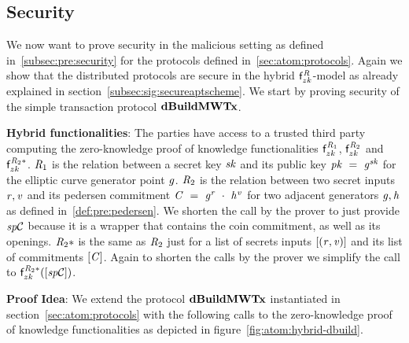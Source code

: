 \subsection{Security}\label{subsec:atom:security}

We now want to prove security in the malicious setting as defined in~\ref{subsec:pre:security} for the protocols defined in~\ref{sec:atom:protocols}.
Again we show that the distributed protocols are secure in the hybrid $\mathsf{f}^{\mathit{R}}_{zk}$-model as already explained in section~\ref{subsec:sig:secureaptscheme}.
We start by proving security of the simple transaction protocol $\mathbf{dBuildMWTx}$.

\textbf{Hybrid functionalities}: The parties have access to a trusted third party computing the zero-knowledge proof of knowledge functionalities $\mathsf{f}^{\mathit{R}_1}_{zk}$, $\mathsf{f}^{\mathit{R}_2}_{zk}$ and $\mathsf{f}^{\mathit{R}_2*}_{zk}$.
$\mathit{R}_1$ is the relation between a secret key $\mathit{sk}$ and its public key $\mathit{pk} ~=~ \mathit{g}^{\mathit{sk}}$ for the elliptic curve generator point $\mathit{g}$.
$\mathit{R}_2$ is the relation between two secret inputs $\mathit{r}, \mathit{v}$ and its pedersen commitment $\mathit{C} ~=~ \mathit{g}^{\mathit{r}} ~\cdot~ \mathit{h}^{\mathit{v}}$ for two adjacent generators $\mathit{g}, \mathit{h}$ as defined in~\ref{def:pre:pedersen}.
We shorten the call by the prover to just provide $\mathit{sp}\mathcal{C}$ because it is a wrapper that contains the coin commitment, as well as its openings.
$\mathit{R}_2*$ is the same as $\mathit{R}_2$ just for a list of secrets inputs $[(\mathit{r}, \mathit{v})]$ and its list of commitments $[\mathit{C}]$.
Again to shorten the calls by the prover we simplify the call to $\mathsf{f}^{\mathit{R}_2*}_{zk}([\mathit{sp}\mathcal{C}])$.

\textbf{Proof Idea}: We extend the protocol $\mathbf{dBuildMWTx}$ instantiated in section~\ref{sec:atom:protocols} with the following calls to the zero-knowledge proof of knowledge functionalities as depicted in figure~\ref{fig:atom:hybrid-dbuild}.

